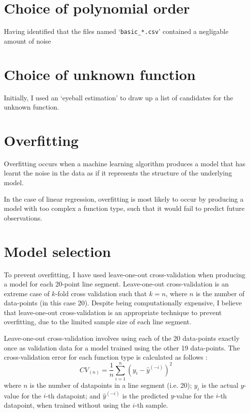 \documentclass[onecolumn, 12t, a4paper]{article}
\begin{document}
\section{Choice of polynomial order}

Having identified that the files named `\texttt{basic\_*.csv}'
contained a negligable amount of noise


\section{Choice of unknown function}

Initially, I used an `eyeball estimation' to draw up a list
of candidates for the unknown function.

\section{Overfitting}

Overfitting occurs when a machine learning algorithm
produces a model that has learnt the noise in the data
as if it represents the structure of the underlying
model. \cite{MSMI}

In the case of linear regression, overfitting is most
likely to occur by producing a model with too complex a function
type, such that it would fail to predict future observations.

\section{Model selection}

To prevent overfitting, I have used leave-one-out
cross-validation when producing a model for each 20-point
line segment. Leave-one-out cross-validation is 
an extreme case of $k$-fold cross validation
such that $k = n$, where
$n$ is the number of data-points (in this case 20).
Despite being computationally expensive, I believe that
leave-one-out cross-validation is an appropriate technique
to prevent overfitting, due to the limited sample size
of each line segment.

Leave-one-out cross-validation involves using each of
the 20 data-points exactly once as validation data for a model
trained using the other 19 data-points. 
The cross-validation error for each function type is calculated
as follows \cite{Stanford}:
\[
    CV_{(n)} = \frac{1}{n} \sum_{i = 1}^{n} (y_{i} - \hat{y}^{(-i)})^{2}
\]
where
$n$ is the number of datapoints in a line segment (i.e. 20);
$y_{i}$ is the actual $y$-value for the $i$-th datapoint;
and $\hat{y}^{(-i)}$ is the predicted $y$-value for the $i$-th
datapoint, when trained without using the $i$-th sample.
\end{document}
